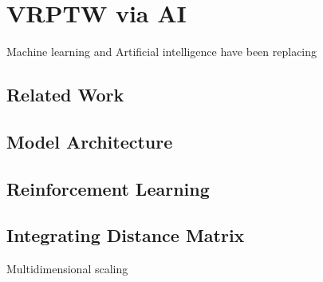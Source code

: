 \chapter{VRPTW via AI}
    Machine learning and Artificial intelligence have been replacing 
    
    \section{Related Work}
        
    \section{Model Architecture}
        
    \section{Reinforcement Learning}
        
    \section{Integrating Distance Matrix}
    Multidimensional scaling
